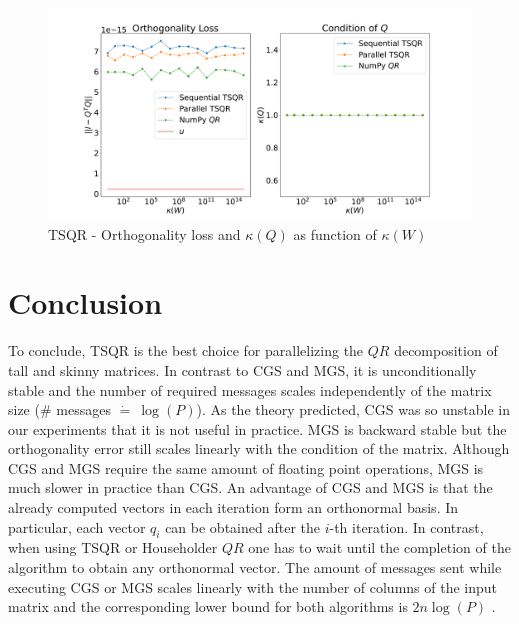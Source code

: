 \documentclass{article}
\begin{document}
\begin{figure}[t]
    \centering %
    \includegraphics[width=\textwidth, trim = 0cm 0cm 0cm 1cm]
        {./plots/TSQR_Orthogonality_Error_complete.pdf}
    \caption{TSQR - Orthogonality loss and $\kappa(Q)$ as function of $\kappa(W)$}
    \label{fig:orthoErrorTSQR}
\end{figure}

\section{Conclusion}
To conclude, TSQR is the best choice for parallelizing the $QR$ decomposition of
tall and skinny matrices. In contrast to CGS and MGS, it is unconditionally
stable and the number of required messages scales independently of the matrix
size ($\#$ messages $\dot{=} \ \log(P)$). As the theory predicted, CGS was so
unstable in our experiments that it is not useful in practice. MGS is backward
stable but the orthogonality error still scales linearly with the condition of
the matrix. Although CGS and MGS require the same amount of floating point
operations, MGS is much slower in practice than CGS. An advantage of CGS and MGS
is that the already computed vectors in each iteration form an orthonormal
basis. In particular, each vector $q_i$ can be obtained after the $i$-th
iteration. In contrast, when using TSQR or Householder $QR$ one has to wait
until the completion of the algorithm to obtain any orthonormal vector. The
amount of messages sent while executing CGS or MGS scales linearly with the
number of columns of the input matrix and the corresponding lower bound for both
algorithms is $2n \log(P)$ \cite{Grigori:2008}.

\clearpage{}


\end{document}
